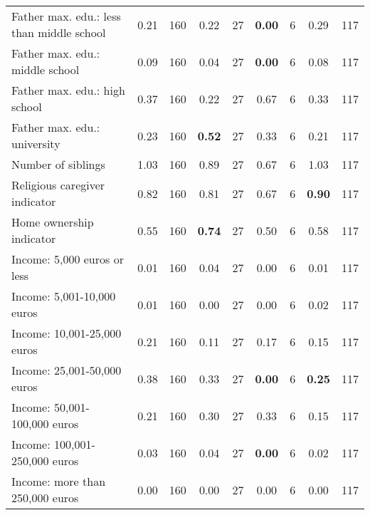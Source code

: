 \begin{tabular}{l c c c c c c c c}
Father max. edu.: less than middle school &      0.21 &       160 &      0.22 &        27 & \textbf{     0.00} &         6 &      0.29 &       117 \\
Father max. edu.: middle school &      0.09 &       160 &      0.04 &        27 & \textbf{     0.00} &         6 &      0.08 &       117 \\
Father max. edu.: high school &      0.37 &       160 &      0.22 &        27 &      0.67 &         6 &      0.33 &       117 \\
Father max. edu.: university &      0.23 &       160 & \textbf{     0.52} &        27 &      0.33 &         6 &      0.21 &       117 \\
Number of siblings &      1.03 &       160 &      0.89 &        27 &      0.67 &         6 &      1.03 &       117 \\
Religious caregiver indicator &      0.82 &       160 &      0.81 &        27 &      0.67 &         6 & \textbf{     0.90} &       117 \\
Home ownership indicator &      0.55 &       160 & \textbf{     0.74} &        27 &      0.50 &         6 &      0.58 &       117 \\
Income: 5,000 euros or less &      0.01 &       160 &      0.04 &        27 &      0.00 &         6 &      0.01 &       117 \\
Income: 5,001-10,000 euros &      0.01 &       160 &      0.00 &        27 &      0.00 &         6 &      0.02 &       117 \\
Income: 10,001-25,000 euros &      0.21 &       160 &      0.11 &        27 &      0.17 &         6 &      0.15 &       117 \\
Income: 25,001-50,000 euros &      0.38 &       160 &      0.33 &        27 & \textbf{     0.00} &         6 & \textbf{     0.25} &       117 \\
Income: 50,001-100,000 euros &      0.21 &       160 &      0.30 &        27 &      0.33 &         6 &      0.15 &       117 \\
Income: 100,001-250,000 euros &      0.03 &       160 &      0.04 &        27 & \textbf{     0.00} &         6 &      0.02 &       117 \\
Income: more than 250,000 euros &      0.00 &       160 &      0.00 &        27 &      0.00 &         6 &      0.00 &       117 \\
\bottomrule
\end{tabular}
